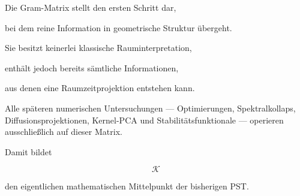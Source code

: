Die Gram-Matrix stellt den ersten Schritt dar,

bei dem reine Information in geometrische Struktur übergeht.

Sie besitzt keinerlei klassische Rauminterpretation,

enthält jedoch bereits sämtliche Informationen,

aus denen eine Raumzeitprojektion entstehen kann.

Alle späteren numerischen Untersuchungen — Optimierungen, Spektralkollaps, Diffusionsprojektionen, Kernel-PCA und Stabilitätsfunktionale — operieren ausschließlich auf dieser Matrix.

Damit bildet

\[
\boxed{\mathcal K}
\]

den eigentlichen mathematischen Mittelpunkt der bisherigen PST.

